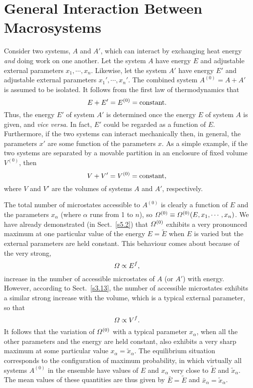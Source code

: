 \section{General Interaction Between Macrosystems}
Consider two systems, $A$ and $A'$, which can interact by exchanging heat energy 
{\em and}
doing work on one another. Let the  system $A$ have energy $E$ and adjustable external
parameters $x_1,\cdots, x_n$. Likewise, let the 
 system $A'$ have energy $E'$ and adjustable
external parameters $x_1',\cdots, x_n'$. The combined system $A^{(0)}=A + A'$ is
assumed to be isolated. It follows from the first law of thermodynamics that
\begin{equation}
E+E' = E^{(0)} = {\rm constant}.
\end{equation}
Thus, the energy $E'$ of system $A'$ is determined once the energy $E$ of
system $A$ is given, and {\em vice versa}. In fact, $E'$ could be regarded as
a function of $E$. Furthermore, if the two systems can interact mechanically then,
in general, the parameters $x'$ are some function of the parameters $x$. As
a simple example, if the two systems are separated by a movable partition in
an enclosure  of fixed volume $V^{(0)}$, then
\begin{equation}
V + V' = V^{(0)} = {\rm constant},
\end{equation}
where $V$  and $V'$ are the volumes of systems $A$ and $A'$, respectively.

The total number of microstates accessible to $A^{(0)}$ is clearly a function of
$E$ and the parameters $x_\alpha$ (where $\alpha$ runs from 1 to $n$), so
${\mit\Omega}^{(0)}\equiv {\mit\Omega}^{(0)}(E, x_1, \cdots, x_n)$. 
We have already demonstrated (in
Sect.~\ref{s5.2}) that
${\mit\Omega}^{(0)}$ exhibits a very pronounced maximum at one particular
value of the energy
$E=\tilde{E}$ when $E$ is varied but the external parameters are held constant.
This behaviour comes about because of the very strong,
\begin{equation}
	{\mit\Omega} \propto E^f,
\end{equation}
increase in the number of accessible microstates of $A$ (or $A'$)
 with energy. However, according to Sect.~\ref{s3.13}, the number of
accessible microstates exhibits a similar strong increase with
 the volume, which is a typical external parameter, so that
\begin{equation}
{\mit\Omega} \propto V^f.
\end{equation}
It follows that  the variation of ${\mit\Omega}^{(0)}$ with a typical parameter $x_\alpha$,
when all the other parameters and the energy are held constant,  also exhibits
 a very
sharp maximum at some particular
value $x_\alpha=\tilde{x}_\alpha$. The equilibrium situation
corresponds to the configuration of maximum probability, in which virtually all
systems $A^{(0)}$ in the ensemble have values of $E$ and $x_\alpha$ very close
to $\tilde{E}$ and $\tilde{x}_\alpha$. The mean values of these quantities are
thus given by $\bar{E}=\tilde{E}$ and $\bar{x}_\alpha= \tilde{x}_\alpha$.

